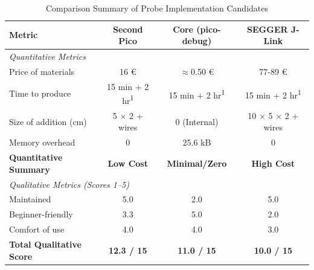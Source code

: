 \begin{table}[H]
  \def\arraystretch{1.3}
  \begin{center}
    \caption{Comparison Summary of Probe Implementation Candidates}
    \label{tab:probe_comparison}
    \begin{tabular}{|l|c|c|c|}
      \hline
      \textbf{Metric} & \textbf{Second Pico} & \textbf{Core (pico-debug)} & \textbf{SEGGER J-Link} \\
      \hline
      \hline
      \multicolumn{4}{|l|}{\textit{Quantitative Metrics}} \\
      \hline
      Price of materials & 16 € & $\approx$0.50 € & 77-89 € \\
      \hline
      Time to produce & 15 min + 2 hr\textsuperscript{1} & 15 min + 2 hr\textsuperscript{1} & 15 min + 2 hr\textsuperscript{1} \\
      \hline
      Size of addition (cm) & 5 $\times$ 2 + wires & 0 (Internal) & 10 $\times$ 5 $\times$ 2 + wires \\
      \hline
      Memory overhead & 0 & 25.6 kB & 0 \\
      \hline

      \textbf{Quantitative Summary} & \textbf{Low Cost} & \textbf{Minimal/Zero} & \textbf{High Cost} \\
      \hline
      \hline
      \multicolumn{4}{|l|}{\textit{Qualitative Metrics (Scores 1--5)}} \\
      \hline
      Maintained & 5.0 & 2.0 & 5.0 \\
      \hline
      Beginner-friendly & 3.3 & 5.0 & 2.0 \\
      \hline
      Comfort of use & 4.0 & 4.0 & 3.0 \\
      \hline
      \textbf{Total Qualitative Score} & \textbf{12.3 / 15} & \textbf{11.0 / 15} & \textbf{10.0 / 15} \\
      \hline
    \end{tabular}
    \vspace{6pt}
  \end{center}
\end{table}
\clearpage

